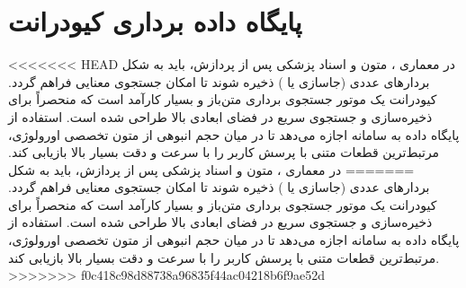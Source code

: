\section{پایگاه داده برداری کیودرانت }
<<<<<<< HEAD
در معماری ، متون و اسناد پزشکی پس از پردازش، باید به شکل بردارهای عددی (جاسازی یا ) ذخیره شوند تا امکان جستجوی معنایی فراهم گردد. کیودرانت یک موتور جستجوی برداری متن‌باز و بسیار کارآمد است که منحصراً برای ذخیره‌سازی و جستجوی سریع در فضای ابعادی بالا طراحی شده است. استفاده از پایگاه داده  به سامانه اجازه می‌دهد تا در میان حجم انبوهی از متون تخصصی اورولوژی، مرتبط‌ترین قطعات متنی با پرسش کاربر را با سرعت و دقت بسیار بالا بازیابی کند.
=======
در معماری ، متون و اسناد پزشکی پس از پردازش، باید به شکل بردارهای عددی (جاسازی یا ) ذخیره شوند تا امکان جستجوی معنایی فراهم گردد. کیودرانت یک موتور جستجوی برداری متن‌باز و بسیار کارآمد است که منحصراً برای ذخیره‌سازی و جستجوی سریع در فضای ابعادی بالا طراحی شده است. استفاده از پایگاه داده  به سامانه اجازه می‌دهد تا در میان حجم انبوهی از متون تخصصی اورولوژی، مرتبط‌ترین قطعات متنی با پرسش کاربر را با سرعت و دقت بسیار بالا بازیابی کند.
>>>>>>> f0c418c98d88738a96835f44ac04218b6f9ae52d
